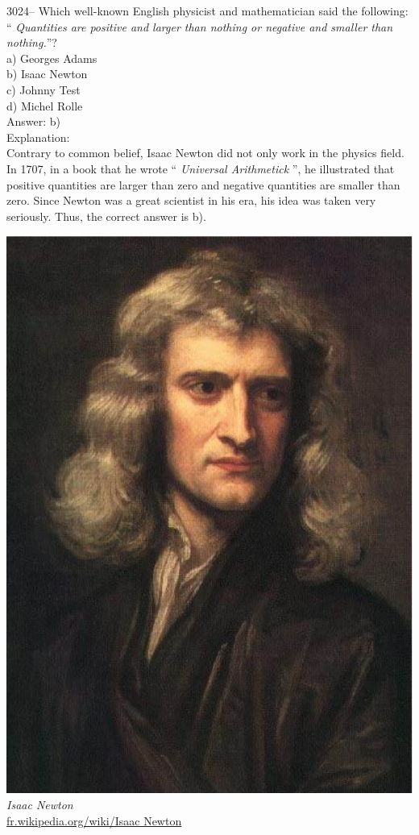 \documentclass[letterpaper, 12pt]{article}
\begin{document}
3024-- Which well-known English physicist and mathematician said the following: `` \emph{Quantities are positive and larger than nothing or negative and smaller than nothing.}''?\\

a) Georges Adams\\
b) Isaac Newton\\
c) Johnny Test\\
d) Michel Rolle\\

Answer: b)\\

Explanation:\\
Contrary to common belief, Isaac Newton did not only work in the physics field. In 1707, in a book that he wrote `` \emph{Universal Arithmetick} '', he illustrated that positive quantities are larger than zero and negative quantities are smaller than zero. Since Newton was a great scientist in his era, his idea was taken very seriously. Thus, the correct answer is b).\\

\begin{center}
\includegraphics[scale=0.2]{IsaacNewton.eps}\\
\emph{{\small Isaac Newton}}\\
\href{http://fr.wikipedia.org/wiki/Isaac Newton}{fr.wikipedia.org/wiki/Isaac Newton}\\[5mm]
\end{center}
\end{document}
